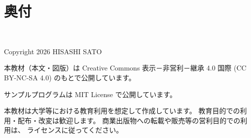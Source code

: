 \chapter*{奥付}

\thispagestyle{plain}

\vspace*{\fill}

\begin{center}
    {\Large \BookTitle}\\[1.5em]
    {\BookSubtitle}
\end{center}

\vspace{3em}

\noindent
Copyright \textcopyright{} 2026 HISASHI SATO

\vspace{2em}

\noindent
本教材（本文・図版）は
Creative Commons
表示－非営利－継承 4.0 国際
(CC BY-NC-SA 4.0)
のもとで公開しています。

\vspace{2em}

\noindent
サンプルプログラムは
MIT License
で公開しています。

\vspace{2em}

\noindent
本教材は大学等における教育利用を想定して作成しています。
教育目的での利用・配布・改変は歓迎します。
商業出版物への転載や販売等の営利目的での利用は、
ライセンスに従ってください。

\vspace*{\fill}
